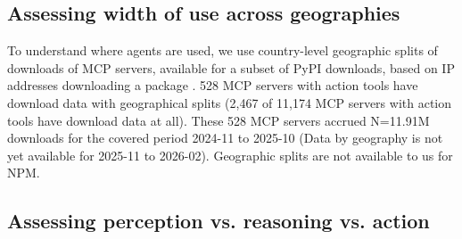 \documentclass[manuscript,screen,nonacm,oneside]{acmart}
\begin{document}
\subsection{Assessing width of use across geographies}
\label{sec:geo-tools}

To understand where agents are used, we use country-level geographic splits of downloads of MCP servers, available for a subset of PyPI downloads, based on IP addresses downloading a package \citep{githubGitHubPypilinehaulcloudfunction}. 528 MCP servers with action tools have download data with geographical splits (2,467 of 11,174 MCP servers with action tools have download data at all). These 528 MCP servers accrued N=11.91M downloads for the covered period 2024-11 to 2025-10 (Data by geography is not yet available for 2025-11 to 2026-02). Geographic splits are not available to us for NPM.
\subsection{Assessing perception vs. reasoning vs. action}
\label{sec:direct-impact}
\end{document}
